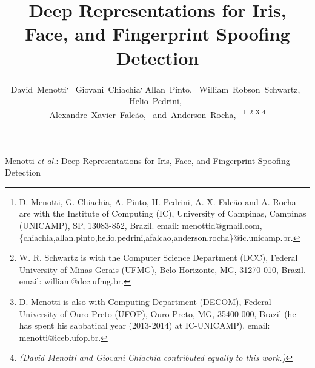 \documentclass[journal]{IEEEtran}
\begin{document}
\sloppy

\title{Deep Representations for Iris, Face, and Fingerprint Spoofing Detection}

\author{David~Menotti\textsuperscript,~
        Giovani~Chiachia\textsuperscript,
        Allan~Pinto,~
        William~Robson~Schwartz,~
        Helio~Pedrini,~\\
        Alexandre~Xavier~Falc\~{a}o,~
        and~Anderson~Rocha,~%
\thanks{D. Menotti, G. Chiachia, A. Pinto, H. Pedrini, A. X. Falc\~{a}o and A. Rocha are with the Institute of Computing (IC), University of Campinas, Campinas (UNICAMP), SP, 13083-852, Brazil. email: menottid@gmail.com, \{chiachia,allan.pinto,helio.pedrini,afalcao,anderson.rocha\}@ic.unicamp.br.}%
\thanks{W. R. Schwartz is with the Computer Science Department (DCC), Federal University of Minas Gerais (UFMG), Belo Horizonte, MG, 31270-010, Brazil. email: william@dcc.ufmg.br.}%
\thanks{D. Menotti is also with Computing Department (DECOM), Federal University of Ouro Preto (UFOP), Ouro Preto, MG, 35400-000, Brazil (he has spent his sabbatical year (2013-2014) at IC-UNICAMP). email: menotti@iceb.ufop.br.}%
\thanks{\textit{(David Menotti and Giovani Chiachia contributed equally to this work.)}}%
}

%
{Menotti \MakeLowercase{\textit{et al.}}: Deep Representations for Iris, Face, and Fingerprint Spoofing Detection}




\maketitle
\end{document}
